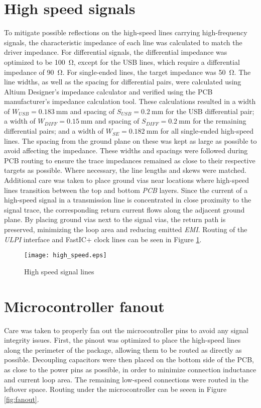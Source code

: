 \section{High speed signals}
To mitigate possible reflections on the high-speed lines carrying high-frequency signals, the characteristic impedance of each line was calculated to match the driver impedance. For differential signals, the differential impedance was optimized to be \SI{100}{\ohm}, except for the USB lines, which require a differential impedance of \SI{90}{\ohm}. For single-ended lines, the target impedance was \SI{50}{\ohm}.
The line widths, as well as the spacing for differential pairs, were calculated using Altium Designer’s impedance calculator and verified using the PCB manufacturer’s impedance calculation tool. These calculations resulted in a width of $W_{USB} = \SI{0.183}{\milli\meter}$ and spacing of $S_{USB} = \SI{0.2}{\milli\meter}$ for the USB differential pair; a width of $W_{DIFF} = \SI{0.15}{\milli\meter}$ and spacing of $S_{DIFF} = \SI{0.2}{\milli\meter}$ for the remaining differential pairs; and a width of $W_{SE} = \SI{0.182}{\milli\meter}$ for all single-ended high-speed lines. The spacing from the ground plane on these was kept as large as possible to avoid affecting the impedance. These widths and spacings were followed during PCB routing to ensure the trace impedances remained as close to their respective targets as possible. Where necessary, the line lengths and skews were matched. Additional care was taken to place ground vias near locations where high-speed lines transition between the top and bottom \emph{PCB} layers. Since the current of a high-speed signal in a transmission line is concentrated in close proximity to the signal trace, the corresponding return current flows along the adjacent ground plane. By placing ground vias next to the signal vias, the return path is preserved, minimizing the loop area and reducing emitted \emph{EMI}. Routing of the \emph{ULPI} interface and FastIC+ clock lines can be seen in Figure \ref{fig:highspeed}. \cite{highSpeedGuidlines} \cite{HighSpeedDesign}

\FloatBarrier
\begin{figure}[htp!]
    \centering
    \texttt{[image: high\_speed.eps]}
    \caption{High speed signal lines}
    \label{fig:highspeed}
\end{figure}
\FloatBarrier

\section{Microcontroller fanout}
Care was taken to properly fan out the microcontroller pins to avoid any signal integrity issues. First, the pinout was optimized to place the high-speed lines along the perimeter of the package, allowing them to be routed as directly as possible. Decoupling capacitors were then placed on the bottom side of the PCB, as close to the power pins as possible, in order to minimize connection inductance and current loop area. The remaining low-speed connections were routed in the leftover space. Routing under the microcontroller can be seeen in Figure \ref{fig:fanout}.

